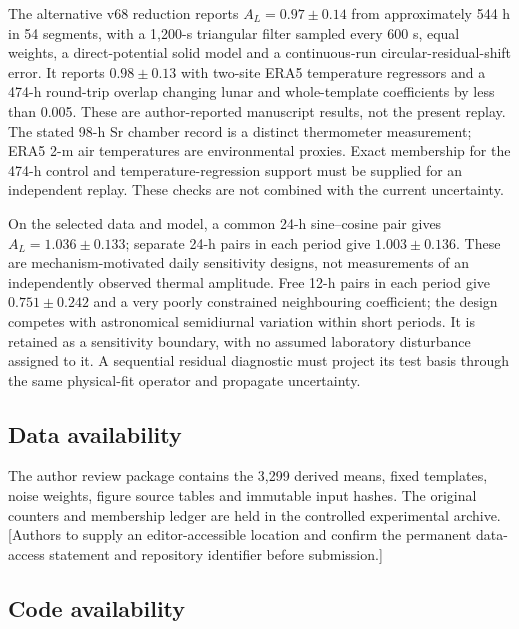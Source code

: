 \documentclass[
  10pt,
  a4paper,
]{article}
\begin{document}
The alternative v68 reduction reports \(A_L=0.97\pm0.14\) from
approximately 544 h in 54 segments, with a 1,200-s triangular filter
sampled every 600 s, equal weights, a direct-potential solid model and a
continuous-run circular-residual-shift error. It reports \(0.98\pm0.13\)
with two-site ERA5 temperature regressors and a 474-h round-trip overlap
changing lunar and whole-template coefficients by less than 0.005. These
are author-reported manuscript results, not the present replay. The
stated 98-h Sr chamber record is a distinct thermometer measurement;
ERA5 2-m air temperatures are environmental proxies. Exact membership
for the 474-h control and temperature-regression support must be
supplied for an independent replay. These checks are not combined with
the current uncertainty.

On the selected data and model, a common 24-h sine--cosine pair gives
\(A_L=1.036\pm0.133\); separate 24-h pairs in each period give
\(1.003\pm0.136\). These are mechanism-motivated daily sensitivity
designs, not measurements of an independently observed thermal
amplitude. Free 12-h pairs in each period give \(0.751\pm0.242\) and a
very poorly constrained neighbouring coefficient; the design competes
with astronomical semidiurnal variation within short periods. It is
retained as a sensitivity boundary, with no assumed laboratory
disturbance assigned to it. A sequential residual diagnostic must
project its test basis through the same physical-fit operator and
propagate uncertainty.

\singlespacing

\hypertarget{data-availability}{%
\subsection{Data availability}\label{data-availability}}

The author review package contains the 3,299 derived means, fixed
templates, noise weights, figure source tables and immutable input
hashes. The original counters and membership ledger are held in the
controlled experimental archive. {[}Authors to supply an
editor-accessible location and confirm the permanent data-access
statement and repository identifier before submission.{]}

\singlespacing

\hypertarget{code-availability}{%
\subsection{Code availability}\label{code-availability}}
\end{document}
